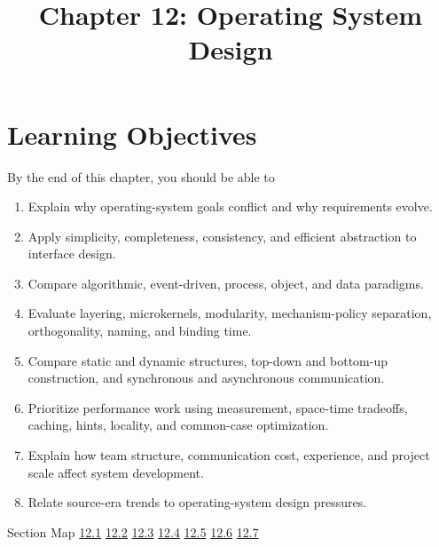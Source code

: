 \documentclass[10pt,letterpaper]{article}
\title{Chapter 12: Operating System Design}
\author{}
\date{}
\begin{document}
\maketitle
\section*{Learning Objectives}
\begin{studybox}{By the end of this chapter, you should be able to}
\begin{enumerate}
  \item Explain why operating-system goals conflict and why requirements evolve.
  \item Apply simplicity, completeness, consistency, and efficient abstraction to interface design.
  \item Compare algorithmic, event-driven, process, object, and data paradigms.
  \item Evaluate layering, microkernels, modularity, mechanism-policy separation, orthogonality, naming, and binding time.
  \item Compare static and dynamic structures, top-down and bottom-up construction, and synchronous and asynchronous communication.
  \item Prioritize performance work using measurement, space-time tradeoffs, caching, hints, locality, and common-case optimization.
  \item Explain how team structure, communication cost, experience, and project scale affect system development.
  \item Relate source-era trends to operating-system design pressures.
\end{enumerate}
\end{studybox}

\begin{studybox}{Section Map}
\hyperlink{sec-12-1}{12.1} \quad \hyperlink{sec-12-2}{12.2} \quad \hyperlink{sec-12-3}{12.3} \quad \hyperlink{sec-12-4}{12.4} \quad \hyperlink{sec-12-5}{12.5} \quad \hyperlink{sec-12-6}{12.6} \quad \hyperlink{sec-12-7}{12.7}
\end{studybox}
\end{document}
